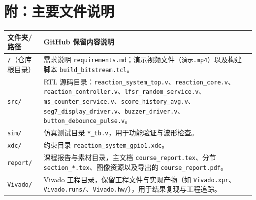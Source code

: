 \documentclass[UTF8]{ctexart}
\begin{document}
\section*{附：主要文件说明}
\begin{longtable}{p{} p{}}
\toprule
文件夹/路径 & GitHub 保留内容说明 \\
\midrule
\texttt{/}（仓库根目录） & 需求说明 \texttt{requirements.md}；演示视频文件（\texttt{演示.mp4}）以及构建脚本 \texttt{build\_bitstream.tcl}。 \\
\texttt{src/} & RTL 源码目录：\texttt{reaction\_system\_top.v}、\texttt{reaction\_core.v}、\texttt{reaction\_controller.v}、\texttt{lfsr\_random\_service.v}、\texttt{ms\_counter\_service.v}、\texttt{score\_history\_avg.v}、\texttt{seg7\_display\_driver.v}、\texttt{buzzer\_driver.v}、\texttt{button\_debounce\_pulse.v}。 \\
\texttt{sim/} & 仿真测试目录 \texttt{*\_tb.v}，用于功能验证与波形检查。 \\
\texttt{xdc/} & 约束目录 \texttt{reaction\_system\_gpio1.xdc}。 \\
\texttt{report/} & 课程报告与素材目录，主文档 \texttt{course\_report.tex}、分节 \texttt{section\_*.tex}、图像资源以及导出的 \texttt{course\_report.pdf}。 \\
\texttt{Vivado/} & Vivado 工程目录，保留工程文件与实现产物（如 \texttt{Vivado.xpr}、\texttt{Vivado.runs/}、\texttt{Vivado.hw/}），用于结果复现与工程追踪。 \\
\bottomrule
\end{longtable}
\end{document}
